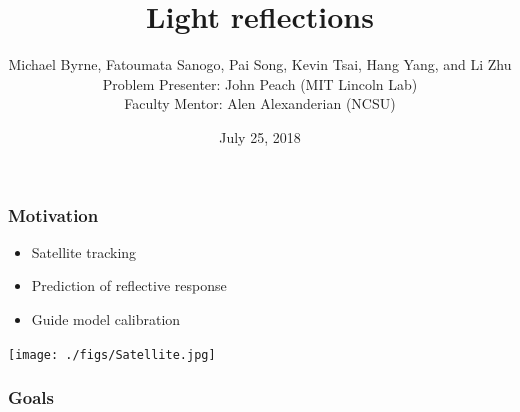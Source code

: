 \documentclass{beamer}
\title{Light reflections}
\date{July 25, 2018}
\author{
Michael Byrne, 
Fatoumata Sanogo,
Pai Song,
Kevin Tsai,
Hang Yang, and
Li Zhu\\
\medskip
Problem Presenter:  John Peach (MIT Lincoln Lab)\\
Faculty Mentor: Alen Alexanderian (NCSU)
}
\institute[Abbreviation]{SAMSI-IMSM}
\begin{document}
\begin{frame}
\titlepage
\end{frame}

\begin{frame}[t] 
\frametitle{Motivation} 
\begin{itemize} 
\item Satellite tracking 
\item Prediction of reflective response 
\item Guide model calibration 
\vspace{2mm}
\end{itemize} 
\centerline{\texttt{[image: ./figs/Satellite.jpg]}} 
\end{frame} 
 
\begin{frame}[t]
\frametitle{Goals} 


\end{frame}
\end{document}
